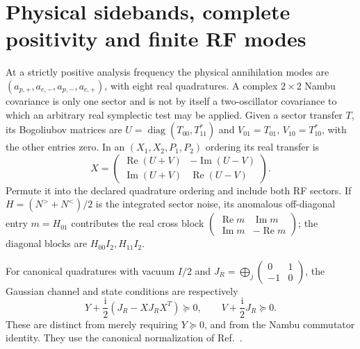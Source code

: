 \documentclass[11pt,a4paper]{article}
\newcommand{\ii}{\mathrm i}
\newcommand{\Rea}{\operatorname{Re}}
\newcommand{\Ima}{\operatorname{Im}}
\begin{document}
\section{Physical sidebands, complete positivity and finite RF modes}
\label{sec:gc-sidebands}

At a strictly positive analysis frequency the physical annihilation modes are
$(a_{p,+},a_{c,-},a_{p,-},a_{c,+})$, with eight real quadratures. A complex
$2\times2$ Nambu covariance is only one sector and is not by itself a
two-oscillator covariance to which an arbitrary real symplectic test may be
applied. Given a sector transfer $T$, its Bogoliubov matrices are
$U=\operatorname{diag}(T_{00},T_{11}^*)$ and
$V_{01}=T_{01}$, $V_{10}=T_{10}^*$, with the other entries zero. In an
$(X_1,X_2,P_1,P_2)$ ordering its real transfer is
\begin{equation}
 X=\begin{pmatrix}
 \Rea(U+V)&-\Ima(U-V)\\
 \Ima(U+V)&\Rea(U-V)
 \end{pmatrix}.
 \label{eq:gc-bogoliubov-real}
\end{equation}
Permute it into the declared quadrature ordering and include both RF sectors.
If $H=(N^>+N^<)/2$ is the integrated sector noise, its anomalous off-diagonal
entry $m=H_{01}$ contributes the real cross block
$\left(\begin{smallmatrix}\Rea m&\Ima m\\\Ima m&-\Rea m\end{smallmatrix}\right)$;
the diagonal blocks are $H_{00}I_2,H_{11}I_2$.

For canonical quadratures with vacuum $I/2$ and
$J_R=\bigoplus_j\left(\begin{smallmatrix}0&1\\-1&0\end{smallmatrix}\right)$,
the Gaussian channel and state conditions are respectively
\begin{equation}
 Y+\frac{\ii}{2}(J_R-XJ_RX^T)\succeq0,
 \qquad V+\frac{\ii}{2}J_R\succeq0.
 \label{eq:gc-cp}
\end{equation}
These are distinct from merely requiring $Y\succeq0$, and from the Nambu
commutator identity. They use the canonical normalization of
Ref.~\cite{Weedbrook2012}.
\end{document}
